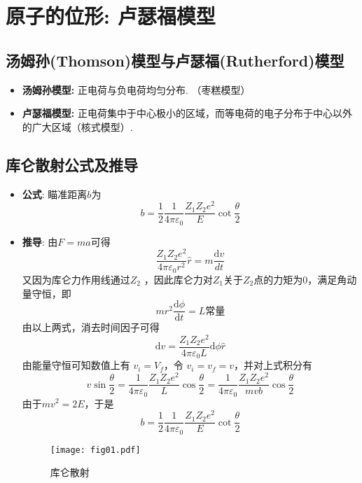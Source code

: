\section{原子的位形: 卢瑟福模型}
\subsection{汤姆孙(Thomson)模型与卢瑟福(Rutherford)模型}
\begin{itemize}
\item \textbf{汤姆孙模型: }正电荷与负电荷均匀分布. （枣糕模型）
\item \textbf{卢瑟福模型: }正电荷集中于中心极小的区域，而等电荷的电子分布于中心以外的广大区域（核式模型）. 
\end{itemize}

\subsection{库仑散射公式及推导}
\begin{itemize}
\item \textbf{公式}: 瞄准距离$b$为
\[
b=\frac{1}{2}\frac{1}{4\pi
\varepsilon_0}\frac{Z_1Z_2e^2}{E}\cot\frac{\theta}{2}
\]
\item \textbf{推导}: 由$F=ma$可得
\[
\frac{Z_1Z_2e^2}{4\pi\varepsilon_0r^2}\hat{r}=m\frac{\textrm{d}v}{dt}
\]
又因为库仑力作用线通过$Z_2$ ，因此库仑力对$Z_1$关于$Z_2$点的力矩为0，满足角动量守恒，即
\[
mr^2\frac{\textrm{d}\phi}{\textrm{d}t}=L\textrm{常量}
\]
由以上两式，消去时间因子可得
\[
\textrm{d}v=\frac{Z_1Z_2e^2}{4\pi\varepsilon_0L}\textrm{d}\phi\hat{r}
\]
由能量守恒可知数值上有 $v_i=V_f$，令 $v_i=v_f=v$，并对上式积分有
\[
v\sin\frac{\theta}{2}=\frac{1}{4\pi\varepsilon_0}\frac{Z_1Z_2e^2}{L}\cos\frac{\theta}{2}=\frac{1}{4\pi\varepsilon_0}\frac{Z_1Z_2e^2}{mvb}\cos\frac{\theta}{2}
\]
由于$mv^2=2E$，于是
\[
b=\frac{1}{2}\frac{1}{4\pi\varepsilon_0}\frac{Z_1Z_2e^2}{E}\cot\frac{\theta}{2}
\]
\begin{figure}[!htb]
\centering
\texttt{[image: fig01.pdf]}
\caption{库仑散射}
\end{figure}
\end{itemize}

